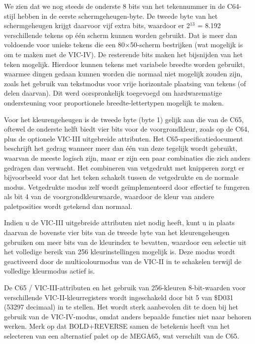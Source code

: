 We zien dat we nog steeds de onderste 8 bits van het tekennummer in de C64-stijl hebben in de eerste schermgeheugen-byte. De tweede byte van het schermgeheugen krijgt daarvoor vijf extra bits, waardoor er 2$^{13}$ = 8.192 verschillende tekens op één scherm kunnen worden gebruikt. Dat is meer dan voldoende voor unieke tekens die een 80$\times$50-scherm bestrijken (wat mogelijk is om te maken met de VIC-IV).  De resterende bits maken het bijsnijden van het teken mogelijk.  Hierdoor kunnen tekens met variabele breedte worden gebruikt, waarmee dingen gedaan kunnen worden die normaal niet mogelijk zouden zijn, zoals het gebruik van tekstmodus voor vrije horizontale plaatsing van tekens (of delen daarvan). Dit werd oorspronkelijk toegevoegd om hardwarematige ondersteuning voor proportionele breedte-lettertypen mogelijk te maken.

Voor het kleurengeheugen is de tweede byte (byte 1) gelijk aan die van de C65, oftewel de onderste helft biedt vier bits voor de voorgrondkleur, zoals op de C64, plus de optionele VIC-III uitgebreide attributen. Het C65-specificatiedocument beschrijft het gedrag wanneer meer dan één van deze tegelijk wordt gebruikt, waarvan de meeste logisch zijn, maar er zijn een paar combinaties die zich anders gedragen dan verwacht. Het combineren van vetgedrukt met knipperen zorgt er bijvoorbeeld voor dat het teken schakelt tussen de vetgedrukte en de normale modus. Vetgedrukte modus zelf wordt geïmplementeerd door effectief te fungeren als bit 4 van de voorgrondkleurwaarde, waardoor de kleur van andere paletposities wordt getekend dan normaal.

Indien u de VIC-III uitgebreide attributen niet nodig heeft, kunt u in plaats daarvan de bovenste vier bits van de tweede byte van het kleurengeheugen gebruiken om meer bits van de kleurindex te bevatten, waardoor een selectie uit het volledige bereik van 256 kleurinstellingen mogelijk is.  Deze modus wordt geactiveerd door de multicolourmodus van de VIC-II in te schakelen terwijl de volledige kleurmodus actief is.

De C65 / VIC-III-attributen en het gebruik van 256-kleuren 8-bit-waarden voor verschillende VIC-II-kleurregisters wordt ingeschakeld door bit 5 van \$D031 (53297 decimaal) in te stellen.  Het wordt sterk aanbevolen dit te doen bij het gebruik van de VIC-IV-modus, omdat anders bepaalde functies niet naar behoren werken. Merk op dat BOLD+REVERSE samen de betekenis heeft van het selecteren van een alternatief palet op de MEGA65, wat verschilt van de C65.

